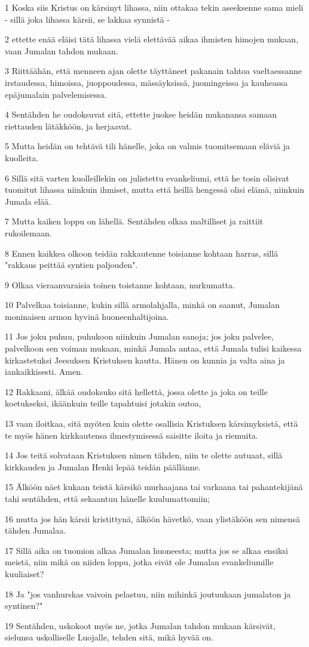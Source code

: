 \par 1 Koska siis Kristus on kärsinyt lihassa, niin ottakaa tekin aseeksenne sama mieli - sillä joka lihassa kärsii, se lakkaa synnistä -
\par 2 ettette enää eläisi tätä lihassa vielä elettävää aikaa ihmisten himojen mukaan, vaan Jumalan tahdon mukaan.
\par 3 Riittäähän, että menneen ajan olette täyttäneet pakanain tahtoa vaeltaessanne irstaudessa, himoissa, juoppoudessa, mässäyksissä, juomingeissa ja kauheassa epäjumalain palvelemisessa.
\par 4 Sentähden he oudoksuvat sitä, ettette juokse heidän mukanansa samaan riettauden lätäkköön, ja herjaavat.
\par 5 Mutta heidän on tehtävä tili hänelle, joka on valmis tuomitsemaan eläviä ja kuolleita.
\par 6 Sillä sitä varten kuolleillekin on julistettu evankeliumi, että he tosin olisivat tuomitut lihassa niinkuin ihmiset, mutta että heillä hengessä olisi elämä, niinkuin Jumala elää.
\par 7 Mutta kaiken loppu on lähellä. Sentähden olkaa maltilliset ja raittiit rukoilemaan.
\par 8 Ennen kaikkea olkoon teidän rakkautenne toisianne kohtaan harras, sillä "rakkaus peittää syntien paljouden".
\par 9 Olkaa vieraanvaraisia toinen toistanne kohtaan, nurkumatta.
\par 10 Palvelkaa toisianne, kukin sillä armolahjalla, minkä on saanut, Jumalan moninaisen armon hyvinä huoneenhaltijoina.
\par 11 Jos joku puhuu, puhukoon niinkuin Jumalan sanoja; jos joku palvelee, palvelkoon sen voiman mukaan, minkä Jumala antaa, että Jumala tulisi kaikessa kirkastetuksi Jeesuksen Kristuksen kautta. Hänen on kunnia ja valta aina ja iankaikkisesti. Amen.
\par 12 Rakkaani, älkää oudoksuko sitä hellettä, jossa olette ja joka on teille koetukseksi, ikäänkuin teille tapahtuisi jotakin outoa,
\par 13 vaan iloitkaa, sitä myöten kuin olette osallisia Kristuksen kärsimyksistä, että te myös hänen kirkkautensa ilmestymisessä saisitte iloita ja riemuita.
\par 14 Jos teitä solvataan Kristuksen nimen tähden, niin te olette autuaat, sillä kirkkauden ja Jumalan Henki lepää teidän päällänne.
\par 15 Älköön näet kukaan teistä kärsikö murhaajana tai varkaana tai pahantekijänä tahi sentähden, että sekaantuu hänelle kuulumattomiin;
\par 16 mutta jos hän kärsii kristittynä, älköön hävetkö, vaan ylistäköön sen nimensä tähden Jumalaa.
\par 17 Sillä aika on tuomion alkaa Jumalan huoneesta; mutta jos se alkaa ensiksi meistä, niin mikä on niiden loppu, jotka eivät ole Jumalan evankeliumille kuuliaiset?
\par 18 Ja "jos vanhurskas vaivoin pelastuu, niin mihinkä joutuukaan jumalaton ja syntinen?"
\par 19 Sentähden, uskokoot myös ne, jotka Jumalan tahdon mukaan kärsivät, sielunsa uskolliselle Luojalle, tehden sitä, mikä hyvää on.

